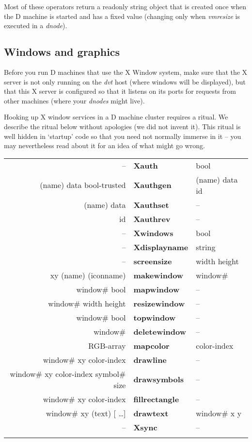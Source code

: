 

Most of these operators return a readonly string object that is
created once when the D machine is started and has a fixed value
(changing only when \emph{vmresize} is executed in a \emph{dnode}).

\subsection{Windows and graphics}\label{ssec:windows}

Before you run D machines that use the X Window system, make sure that the X server is not only running on the \emph{dvt} host (where windows will be displayed), but that this X server is configured so that it listens on its ports for requests from other machines (where your \emph{dnodes} might live).

Hooking up X window services in a D machine cluster requires a ritual. We describe the ritual below without apologies (we did not invent it). This ritual is well hidden in `startup' code so that you need not normally immerse in it -- you may nevertheless read about it for an idea of what might go wrong. \\ 
 

\begin{tabular}{>{\sffamily}r>{\sffamily\bfseries}l>{\sffamily}l}
-- & Xauth & bool\\
(name) data bool-trusted & Xauthgen & (name) data id\\
(name) data & Xauthset & --\\
id & Xauthrev & --\\ 
-- & Xwindows & bool\\
-- & Xdisplayname & string\\
-- & screensize & width height\\
xy (name) (iconname) & makewindow & window\#\\
window\# bool & mapwindow & --\\
window\# width height & resizewindow & --\\
window\# bool & topwindow & --\\
window\# &deletewindow & --\\
RGB-array & mapcolor & color-index\\
window\# xy color-index & drawline & --\\
window\# xy color-index symbol\# size & drawsymbols & --\\
window\# xy color-index & fillrectangle & --\\
window\# xy (text) [ \ldots ] & drawtext & window\# x y\\
-- & Xsync & --\\\\
\end{tabular}

